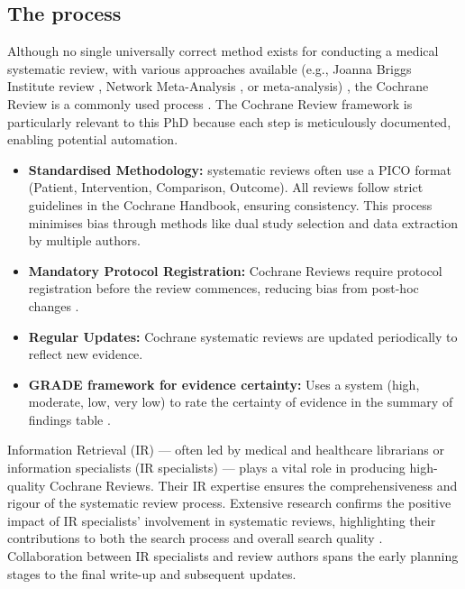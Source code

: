 \documentclass[10pt,oneside]{book}
\begin{document}
\subsection{The process}

Although no single universally correct method exists for conducting a medical systematic review, with various approaches available (e.g., Joanna Briggs Institute review \cite{santos_joanna_2018}, Network Meta-Analysis \cite{bafeta_reporting_2014}, or meta-analysis\cite{moher_improving_1999}) \cite{munn_what_2018}, the Cochrane Review is a commonly used process \cite{cipriani_what_2011}. The Cochrane Review framework is particularly relevant to this PhD because each step is meticulously documented, enabling potential automation.


\begin{itemize}
    \item {\bf{Standardised Methodology:}} systematic reviews often use a PICO format (Patient, Intervention, Comparison, Outcome). All reviews follow strict guidelines in the Cochrane Handbook, ensuring consistency. This process minimises bias through methods like dual study selection and data extraction by multiple authors.
    \item {\bf{Mandatory Protocol Registration:}} Cochrane Reviews require protocol registration before the review commences, reducing bias from post-hoc changes \cite{cumpston_chapter_2024}.
    \item {\bf{Regular Updates:}} Cochrane systematic reviews are updated periodically to reflect new evidence.
    \item {\bf{GRADE framework for evidence certainty:}} Uses a system (high, moderate, low, very low) to rate the certainty of evidence in the summary of findings table \cite{guyatt_grade_2008}.
\end{itemize}



Information Retrieval (IR) — often led by medical and healthcare librarians or information specialists (IR specialists) — plays a vital role in producing high-quality Cochrane Reviews. Their IR expertise ensures the comprehensiveness and rigour of the systematic review process. Extensive research confirms the positive impact of IR specialists' involvement in systematic reviews, highlighting their contributions to both the search process \cite{le_benchmarking_2023, brunskill_case_2022, schvaneveldt_assessing_2021} and overall search quality \cite{giroudon_qualite_2023, pawliuk_librarian_2024, ramirez_adherence_2022}. Collaboration between IR specialists and review authors spans the early planning stages to the final write-up and subsequent updates.
\end{document}
